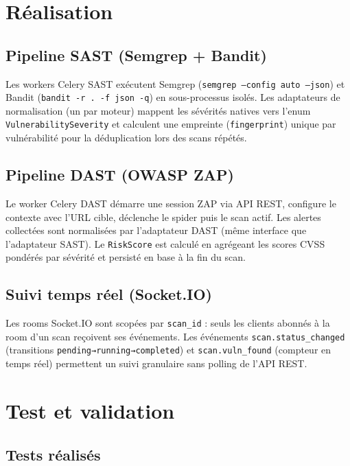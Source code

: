 \section{Réalisation}

\subsection{Pipeline SAST (Semgrep + Bandit)}
Les workers Celery SAST exécutent Semgrep (\texttt{semgrep --config auto --json}) et Bandit (\texttt{bandit -r . -f json -q}) en sous-processus isolés. Les adaptateurs de normalisation (un par moteur) mappent les sévérités natives vers l'enum \texttt{VulnerabilitySeverity} et calculent une empreinte (\texttt{fingerprint}) unique par vulnérabilité pour la déduplication lors des scans répétés.

\subsection{Pipeline DAST (OWASP ZAP)}
Le worker Celery DAST démarre une session ZAP via API REST, configure le contexte avec l'URL cible, déclenche le spider puis le scan actif. Les alertes collectées sont normalisées par l'adaptateur DAST (même interface que l'adaptateur SAST). Le \texttt{RiskScore} est calculé en agrégeant les scores CVSS pondérés par sévérité et persisté en base à la fin du scan.

\subsection{Suivi temps réel (Socket.IO)}
Les rooms Socket.IO sont scopées par \texttt{scan\_id} : seuls les clients abonnés à la room d'un scan reçoivent ses événements. Les événements \texttt{scan.status\_changed} (transitions \texttt{pending→running→completed}) et \texttt{scan.vuln\_found} (compteur en temps réel) permettent un suivi granulaire sans polling de l'API REST.

\section{Test et validation}

\subsection{Tests réalisés}

